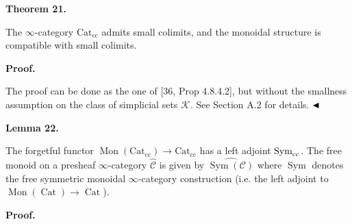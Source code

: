 \documentclass[10pt,a4paper]{article}
\begin{document}
 
 
\par\medskip\noindent\textbf{Theorem 21.}\par
 
 
The $\infty$-category $\operatorname{Cat_{cc}}$ admits small colimits, and the monoidal structure is compatible with small colimits.\par
 
 
 
 
 
\par\medskip\noindent\textbf{Proof.}\par
 
 
The proof can be done as the one of [36, Prop 4.8.4.2], but without the smallness assumption on the class of simplicial sets ${\mathcal{K}}$. See Section A.2 for details. $\hfill\blacktriangleleft$\par
 
 
 
\par\medskip\noindent\textbf{Lemma 22.}\par
 
 
The forgetful functor $\operatorname{Mon}(\operatorname{Cat_{cc}})\to\operatorname{Cat_{cc}}$ has a left adjoint $\operatorname{Sym}_{\textnormal{cc}}$. The free monoid on a presheaf $\infty$-category $\widehat{{\mathcal{C}}}$ is given by $\widehat{\operatorname{Sym}({\mathcal{C}})}$ where $\operatorname{Sym}$ denotes the free symmetric monoidal $\infty$-category construction (i.e. the left adjoint to $\operatorname{Mon}(\operatorname{Cat})\to\operatorname{Cat}$).\par
 
 
 
 
 
\par\medskip\noindent\textbf{Proof.}\par
 
\end{document}

